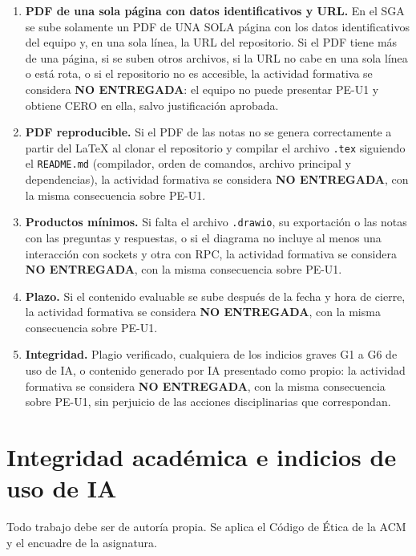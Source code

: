\documentclass[11pt]{article}
\newcommand{\seccion}[1]{\section{\textcolor{utegreendk}{#1}}}
\begin{document}
\begin{cajapiso}[title={Condiciones de entrega válida (criterios de piso): su incumplimiento equivale a no entregar}]
	\begin{enumerate}[label=\textbf{P\arabic*.},leftmargin=24pt,itemsep=3pt]
		\item \textbf{PDF de una sola página con datos identificativos y URL.} En el SGA se sube solamente un PDF de UNA SOLA página con los datos identificativos del equipo y, en una sola línea, la URL del repositorio. Si el PDF tiene más de una página, si se suben otros archivos, si la URL no cabe en una sola línea o está rota, o si el repositorio no es accesible, la actividad formativa se considera \textbf{NO ENTREGADA}: el equipo no puede presentar PE-U1 y obtiene CERO en ella, salvo justificación aprobada.
		\item \textbf{PDF reproducible.} Si el PDF de las notas no se genera correctamente a partir del \LaTeX{} al clonar el repositorio y compilar el archivo \texttt{.tex} siguiendo el \texttt{README.md} (compilador, orden de comandos, archivo principal y dependencias), la actividad formativa se considera \textbf{NO ENTREGADA}, con la misma consecuencia sobre PE-U1.
		\item \textbf{Productos mínimos.} Si falta el archivo \texttt{.drawio}, su exportación o las notas con las preguntas y respuestas, o si el diagrama no incluye al menos una interacción con sockets y otra con RPC, la actividad formativa se considera \textbf{NO ENTREGADA}, con la misma consecuencia sobre PE-U1.
		\item \textbf{Plazo.} Si el contenido evaluable se sube después de la fecha y hora de cierre, la actividad formativa se considera \textbf{NO ENTREGADA}, con la misma consecuencia sobre PE-U1.
		\item \textbf{Integridad.} Plagio verificado, cualquiera de los indicios graves G1 a G6 de uso de IA, o contenido generado por IA presentado como propio: la actividad formativa se considera \textbf{NO ENTREGADA}, con la misma consecuencia sobre PE-U1, sin perjuicio de las acciones disciplinarias que correspondan.
	\end{enumerate}
\end{cajapiso}

\seccion{Integridad académica e indicios de uso de IA}

Todo trabajo debe ser de autoría propia. Se aplica el Código de Ética de la ACM \citep{acm_code_2018} y el encuadre de la asignatura.
\end{document}
